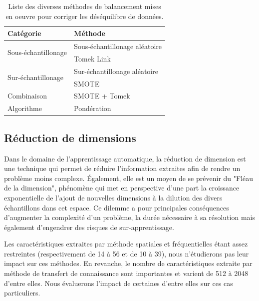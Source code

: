 \begin{table}[H]
    \centering
    \begin{tabular*}{0.6\linewidth}{l@{\extracolsep{\fill}}l}
    \toprule
    \textbf{Catégorie}                  & \textbf{Méthode}                  \\ \hline
    \multirow{2}{*}{Sous-échantillonage}& Sous-échantillonage aléatoire     \\ \cline{2-2}
                                        & Tomek Link                        \\ \hline
    \multirow{2}{*}{Sur-échantillonage} & Sur-échantillonage aléatoire      \\ \cline{2-2}
                                        & SMOTE                             \\ \hline
    Combinaison                         & SMOTE + Tomek                     \\ \hline 
    Algorithme                          & Pondération                       \\
    \bottomrule
    \end{tabular*}
    \caption{Liste des diverses méthodes de balancement mises en oeuvre pour corriger les déséquilibre de données.}
    \label{tab:summary_balancement_methods}
\end{table}\par

\subsection{Réduction de dimensions}
Dans le domaine de l'apprentissage automatique, la réduction de dimension est une technique qui permet de réduire l'information extraites afin de rendre un problème moins complexe. Également, elle est un moyen de se prévenir du "Fléau de la dimension", phénomène qui met en perspective d'une part la croissance exponentielle de l'ajout de nouvelles dimensions à la dilution des divers échantillons dans cet espace. Ce dilemme a pour principales conséquences d'augmenter la complexité d'un problème, la durée nécessaire à sa résolution mais également d'engendrer des risques de sur-apprentissage.\par

Les caractéristiques extraites par méthode spatiales et fréquentielles étant assez restreintes (respectivement de 14 à 56 et de 10 à 39), nous n'étudierons pas leur impact sur ces méthodes. En revanche, le nombre de caractéristiques extraite par méthode de transfert de connaissance sont importantes et varient de 512 à 2048 d'entre elles. Nous évaluerons l'impact de certaines d'entre elles sur ces cas particuliers.\par

